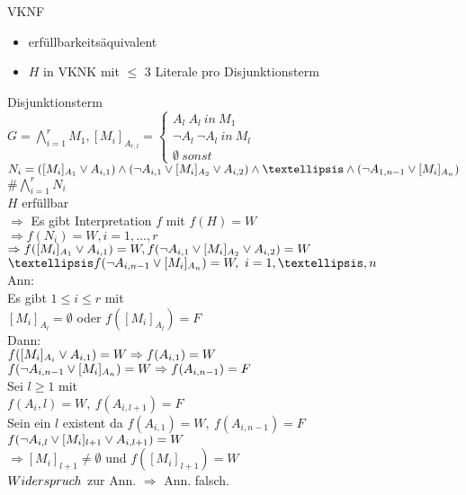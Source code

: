 

 VKNF
\begin{itemize}
\item erfüllbarkeitsäquivalent
\item $H$ in VKNK mit $\leq$ 3 Literale pro Disjunktionsterm
\end{itemize}

Disjunktionsterm\\

\beweis{}
$G = \bigwedge_{i=1}^r M_1, [M_i]_{A_{r,l}} = \begin{cases} A_l\ A_l\ in\ M_1 \\ \neg A_l\ \neg A_l\ in\ M_l \\ \emptyset\ sonst \end{cases}$\\

$N_i = ( [M_i]_{A_1} \OR A_{i,1}) \AND ( \neg A_{i,1} \OR [M_i]_{A_2} \OR A_{i,2}) \AND … \AND ( \neg A_{1,n-1} \OR [M_i]_{A_n})$\\
$\# \bigwedge_{i=1}^r N_i$\\

$H$ erfüllbar\\
$\Rightarrow$ Es gibt Interpretation $f$ mit $f(H) = W$\\
$\Rightarrow f(N_i) = W, i=1, …, r$\\
$\Rightarrow f([M_i]_{A_1} \vee A_{i,1}) = W, f(\neg A_{i,1} \vee [M_i]_{A_2} \vee A_{i,2}) = W$\\
$… f(\neg A_{i,n-1} \OR [M_i]_{A_n}) = W,\ i=1, …, n$\\

Ann:\\
Es gibt $1 \leq i \leq r$ mit \\
$[M_i]_{A_l} = \emptyset$ oder $f([M_i]_{A_l}) = F$\\
Dann:\\
$f([M_i]_{A_i} \vee A_{i,1}) = W \Rightarrow f(A_{i,1}) = W$\\
$f(\neg A_{i,n-1} \vee [M_i]_{A_n} )=W \Rightarrow f(A_{i,n-1})=F$\\

Sei $l \geq 1$ mit\\
$f(A_i,l) = W,\ f(A_{i,l+1}) = F$\\
Sein ein $l$ existent da $f(A_{i,1}) = W,\ f(A_{i,n-1}) = F$\\
$f(\neg A_{i,l} \vee [M_i]_{l+1} \vee A_{i,l+1})=W$\\
$\Rightarrow [M_i]_{l+1} \neq \emptyset$ und $f([M_i]_{l+1}) = W$\\
$Widerspruch$ zur Ann. $\Rightarrow$ Ann. falsch.\\

